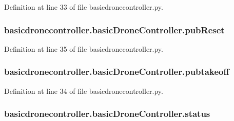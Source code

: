 Definition at line 33 of file basicdronecontroller.\-py.

\hypertarget{classbasicdronecontroller_1_1basicDroneController_ab960a8784bab6e3c99204893f2a4a910}{
\subsubsection[{pub\-Reset}]{\setlength{\rightskip}{0pt plus 5cm}basicdronecontroller.\-basic\-Drone\-Controller.\-pub\-Reset}}\label{classbasicdronecontroller_1_1basicDroneController_ab960a8784bab6e3c99204893f2a4a910}


Definition at line 35 of file basicdronecontroller.\-py.

\hypertarget{classbasicdronecontroller_1_1basicDroneController_a65bf2f7ffe2d7408d865e4b3cdc6bbdf}{
\subsubsection[{pubtakeoff}]{\setlength{\rightskip}{0pt plus 5cm}basicdronecontroller.\-basic\-Drone\-Controller.\-pubtakeoff}}\label{classbasicdronecontroller_1_1basicDroneController_a65bf2f7ffe2d7408d865e4b3cdc6bbdf}


Definition at line 34 of file basicdronecontroller.\-py.

\hypertarget{classbasicdronecontroller_1_1basicDroneController_a18e9a784471aeea334924200a3436ea0}{
\subsubsection[{status}]{\setlength{\rightskip}{0pt plus 5cm}basicdronecontroller.\-basic\-Drone\-Controller.\-status}}\label{classbasicdronecontroller_1_1basicDroneController_a18e9a784471aeea334924200a3436ea0}


